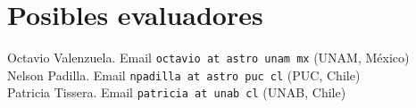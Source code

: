 \section{Posibles evaluadores}

\noindent
Octavio Valenzuela. Email {\texttt{octavio at astro unam mx}} (UNAM, M\'exico)\\
Nelson Padilla. Email {\texttt{npadilla at astro puc cl}} (PUC, Chile)\\
Patricia Tissera. Email {\texttt{patricia at unab cl}} (UNAB, Chile)\\

